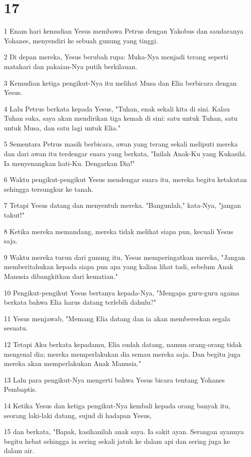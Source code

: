 \chapter{17}

\par 1 Enam hari kemudian Yesus membawa Petrus dengan Yakobus dan saudaranya Yohanes, menyendiri ke sebuah gunung yang tinggi.
\par 2 Di depan mereka, Yesus berubah rupa: Muka-Nya menjadi terang seperti matahari dan pakaian-Nya putih berkilauan.
\par 3 Kemudian ketiga pengikut-Nya itu melihat Musa dan Elia berbicara dengan Yesus.
\par 4 Lalu Petrus berkata kepada Yesus, "Tuhan, enak sekali kita di sini. Kalau Tuhan suka, saya akan mendirikan tiga kemah di sini: satu untuk Tuhan, satu untuk Musa, dan satu lagi untuk Elia."
\par 5 Sementara Petrus masih berbicara, awan yang terang sekali meliputi mereka dan dari awan itu terdengar suara yang berkata, "Inilah Anak-Ku yang Kukasihi. Ia menyenangkan hati-Ku. Dengarkan Dia!"
\par 6 Waktu pengikut-pengikut Yesus mendengar suara itu, mereka begitu ketakutan sehingga tersungkur ke tanah.
\par 7 Tetapi Yesus datang dan menyentuh mereka. "Bangunlah," kata-Nya, "jangan takut!"
\par 8 Ketika mereka memandang, mereka tidak melihat siapa pun, kecuali Yesus saja.
\par 9 Waktu mereka turun dari gunung itu, Yesus memperingatkan mereka, "Jangan memberitahukan kepada siapa pun apa yang kalian lihat tadi, sebelum Anak Manusia dibangkitkan dari kematian."
\par 10 Pengikut-pengikut Yesus bertanya kepada-Nya, "Mengapa guru-guru agama berkata bahwa Elia harus datang terlebih dahulu?"
\par 11 Yesus menjawab, "Memang Elia datang dan ia akan membereskan segala sesuatu.
\par 12 Tetapi Aku berkata kepadamu, Elia sudah datang, namun orang-orang tidak mengenal dia; mereka memperlakukan dia semau mereka saja. Dan begitu juga mereka akan memperlakukan Anak Manusia."
\par 13 Lalu para pengikut-Nya mengerti bahwa Yesus bicara tentang Yohanes Pembaptis.
\par 14 Ketika Yesus dan ketiga pengikut-Nya kembali kepada orang banyak itu, seorang laki-laki datang, sujud di hadapan Yesus,
\par 15 dan berkata, "Bapak, kasihanilah anak saya. Ia sakit ayan. Serangan ayannya begitu hebat sehingga ia sering sekali jatuh ke dalam api dan sering juga ke dalam air.

